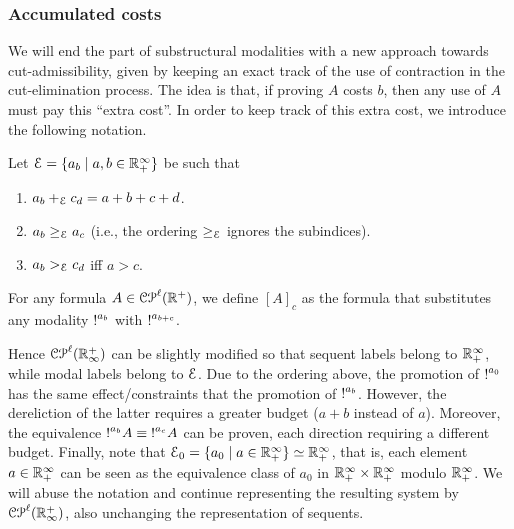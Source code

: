 \subsubsection{Accumulated costs}
We will end the part of substructural modalities with a new approach towards cut-admissibility, given by keeping an exact track of the use of contraction in the cut-elimination process.  
The idea is that, if proving $A$ costs $b$, then any use of $A$  
must pay this ``extra cost''. In order to keep track of this extra cost, we introduce the following notation.

\begin{definition}
Let $\mathcal{E}=\{a_b\mid a,b\in \mathbb{R}_+^\infty\}$ be such that 
\begin{enumerate}
\item $a_b+_{\mathcal{E}} c_d=a+b+c+d$.
\item $a_b \geq_{\mathcal{E}} a_c$ (i.e., the ordering $\geq_{\mathcal{E}}$ ignores the subindices).
\item $a_b >_{\mathcal{E}} c_d$ iff $a>c$.
\end{enumerate}
For any formula $A\in\mathcal{CP}^\ell(\mathbb{R}^{+})$, we define $[A]_c$ as the formula that substitutes any 
modality $\hbox{$\mathop{!}^{a_b}$}{}$ with $\hbox{$\mathop{!}^{a_{b+c}}$}$.
\end{definition}
Hence $\mathcal{CP}^\ell(\mathbb{R}^{+}_\infty)$ can be slightly modified so that sequent labels belong to  $\mathbb{R}_+^\infty$, while modal labels belong to $\mathcal{E}$. Due to the ordering above, the promotion of $\hbox{$\mathop{!}^{a_0}$}$ 
has the same effect/constraints that the promotion of $\hbox{$\mathop{!}^{a_b}$}$. However, the dereliction of the latter requires a greater budget ($a+b$ instead of $a$). Moreover, the equivalence $\hbox{$\mathop{!}^{a_b}$}A \equiv \hbox{$\mathop{!}^{a_c}$}A$ can be proven, each direction requiring a different budget.
Finally, note that $\mathcal{E}_0=\{a_0\mid a\in \mathbb{R}_+^\infty\}\simeq \mathbb{R}_+^\infty$, that is, each element $a\in\mathbb{R}_+^\infty$ can be seen as the equivalence class of $a_0$ in $\mathbb{R}_+^\infty\times \mathbb{R}_+^\infty$ modulo $\mathbb{R}_+^\infty$.
We will abuse the notation and continue representing the resulting system by $\mathcal{CP}^\ell(\mathbb{R}^{+}_\infty)$, also unchanging the representation of sequents. 


